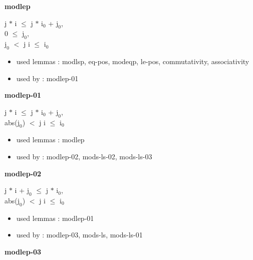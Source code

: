 \documentclass[a4paper]{article}
\begin{document}
\bigskip

{\large\bf modlep}

\medskip

j $*$ i $\le$ j $*$ $\mbox{i}_{0}$ + $\mbox{j}_{0}$, \\
0 $\le$ $\mbox{j}_{0}$, \\
$\mbox{j}_{0}$ $<$ j \Fol i $\le$ $\mbox{i}_{0}$

\begin{itemize}


\item       used lemmas  : modlsp, eq-pos, modeqp, le-pos, commutativity, associativity
\item       used by      : modlep-01

\end{itemize}

\medskip

\bigskip

{\large\bf modlep-01}

\medskip

j $*$ i $\le$ j $*$ $\mbox{i}_{0}$ + $\mbox{j}_{0}$, \\
abs($\mbox{j}_{0}$) $<$ j \Fol i $\le$ $\mbox{i}_{0}$

\begin{itemize}


\item       used lemmas  : modlep
\item       used by      : modlep-02, mods-ls-02, mods-ls-03

\end{itemize}

\medskip

\bigskip

{\large\bf modlep-02}

\medskip

j $*$ i + $\mbox{j}_{0}$ $\le$ j $*$ $\mbox{i}_{0}$, \\
abs($\mbox{j}_{0}$) $<$ j \Fol i $\le$ $\mbox{i}_{0}$

\begin{itemize}


\item       used lemmas  : modlep-01
\item       used by      : modlep-03, mods-ls, mods-ls-01

\end{itemize}

\medskip

\bigskip

{\large\bf modlep-03}
\end{document}
